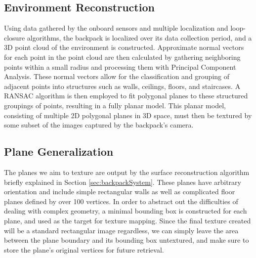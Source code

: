 \documentclass[10pt,twocolumn,letterpaper]{article}
\begin{document}
\subsection{Environment Reconstruction}
Using data gathered by the onboard sensors and multiple localization and
loop-closure algorithms, the backpack is localized over its data
collection period, and a 3D point cloud of the environment is
constructed. Approximate normal vectors for each point in the point
cloud are then calculated by gathering neighboring points within a
small radius and processing them with Principal Component Analysis. These normal vectors allow for the classification and
grouping of adjacent points into structures such as walls, ceilings,
floors, and staircases. A RANSAC algorithm is then employed to fit
polygonal planes to these structured groupings of points, resulting in
a fully planar model. This planar model, consisting of multiple 2D
polygonal planes in 3D space, must then be textured by some subset of the images captured by
the backpack's camera.


\subsection{Plane Generalization}
The planes we aim to texture are output by the surface reconstruction
algorithm briefly explained in Section \ref{sec:backpackSystem}.
These planes have arbitrary orientation and include simple rectangular
walls as well as complicated floor planes defined by over 100
vertices. In order to abstract out the difficulties of dealing with
complex geometry, a minimal bounding box is constructed for each
plane, and used as the target for texture mapping. Since the final
texture created will be a standard rectangular image regardless, we
can simply leave the area between the plane boundary and its bounding
box untextured, and make sure to store the plane's original vertices
for future retrieval.
\end{document}
